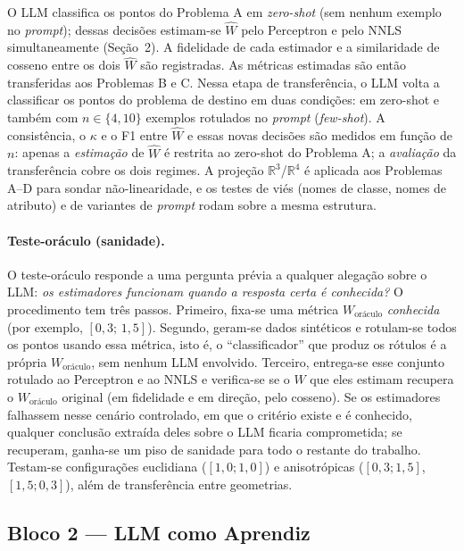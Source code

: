 \documentclass[12pt,a4paper]{article}
\newcommand{\West}{\ensuremath{\hat{W}}}   %
\begin{document}
O LLM classifica os pontos do Problema A em \emph{zero-shot} (sem nenhum exemplo no
\emph{prompt}); dessas decisões estimam-se
\West{} pelo Perceptron e pelo NNLS simultaneamente (Seção~2). A
fidelidade de cada estimador e a similaridade de cosseno entre os dois \West{} são
registradas. As métricas estimadas são então transferidas aos Problemas B e C. Nessa etapa
de transferência, o LLM volta a classificar os pontos do problema de destino em duas
condições: em zero-shot e também com $n \in \{4, 10\}$ exemplos rotulados no \emph{prompt}
(\emph{few-shot}). A consistência, o $\kappa$ e o F1 entre \West{} e essas novas decisões
são medidos em função de $n$: apenas a \emph{estimação} de \West{} é restrita ao
zero-shot do Problema A; a \emph{avaliação} da transferência cobre os dois regimes. A
projeção $\mathbb{R}^3$/$\mathbb{R}^4$ é aplicada aos Problemas A–D
para sondar não-linearidade, e os testes de viés (nomes de classe, nomes de atributo)
e de variantes de \emph{prompt} rodam sobre a mesma estrutura.

\paragraph{Teste-oráculo (sanidade).}
O teste-oráculo responde a uma pergunta prévia a qualquer alegação sobre o LLM: \emph{os
estimadores funcionam quando a resposta certa é conhecida?} O procedimento tem três
passos. Primeiro, fixa-se uma métrica $W_{\text{oráculo}}$ \emph{conhecida} (por exemplo,
$[0{,}3;\,1{,}5]$). Segundo, geram-se dados sintéticos e rotulam-se todos os pontos usando
essa métrica, isto é, o ``classificador'' que produz os rótulos é a própria
$W_{\text{oráculo}}$, sem nenhum LLM envolvido. Terceiro, entrega-se esse conjunto
rotulado ao Perceptron e ao NNLS e verifica-se se o $W$ que eles estimam recupera o
$W_{\text{oráculo}}$ original (em fidelidade e em direção, pelo cosseno). Se os
estimadores falhassem nesse cenário controlado, em que o critério existe e é conhecido,
qualquer conclusão extraída deles sobre o LLM ficaria comprometida; se recuperam, ganha-se
um piso de sanidade para todo o restante do trabalho.
Testam-se configurações euclidiana ($[1{,}0;1{,}0]$) e anisotrópicas ($[0{,}3;1{,}5]$,
$[1{,}5;0{,}3]$), além de transferência entre geometrias.

\subsection{Bloco 2 — LLM como Aprendiz}
\end{document}
